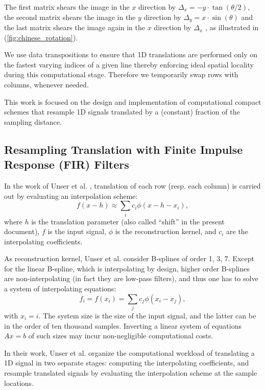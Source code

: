 \documentclass[]{usiinfbachelorproject}
\begin{document}
	The first matrix shears the image in the $x$ direction by $\Delta_x = -y\cdot \tan(\theta/2)$, the second matrix shears the image in the $y$ direction by $\Delta_y = x \cdot \sin(\theta)$ and the last matrix shears the image again in the $x$ direction by $\Delta_x$ , as illustrated in (\ref{fig:chinese_rotation}).
	
	We use data transpositions to ensure that 1D translations are performed only on the fastest varying indices of a given line thereby enforcing ideal spatial locality during this computational stage. Therefore we temporarily swap rows with columns, whenever needed.
	
	This work is focused on the design and implementation of computational compact schemes that resample 1D signals translated by a (constant) fraction of the sampling distance. 
	
	
	\subsection {Resampling Translation with Finite Impulse Response (FIR) Filters}
	In the work of Unser et al. \cite{main_article}, translation of each row (resp. each column) is carried out by evaluating an interpolation scheme:
	\begin{equation}
		f(x-h) \approx \sum_ic_i\phi(x-h - x_i),
	\end{equation}
	where $h$ is the translation parameter (also called ``shift'' in the present document), $f$ is the input signal, $\phi$ is the reconstruction kernel, and $c_i$ are the interpolating coefficients.	
	
	As reconstruction kernel, Unser et al. \cite{main_article} consider B-splines of order 1, 3, 7.
	Except for the linear B-spline, which is interpolating by design, higher order B-splines are non-interpolating (in fact they are low-pass filters), and thus one has to solve a system of interpolating equations:
	\begin{equation}
		f_i = f(x_i) = \sum_jc_j\phi(x_i - x_j),
	\end{equation}
	with $x_i = i$. The system size is the size of the input signal, and the latter can be in the order of ten thousand samples. Inverting a linear system of equations $Ax = b$ of such sizes may incur non-negligible computational costs.
	
	In their work, Unser et al. \cite{main_article} organize the computational workload of translating a 1D signal in two separate stages: computing the interpolating coefficients, and resample translated signals by evaluating the interpolation scheme at the sample locations.
	
\end{document}
